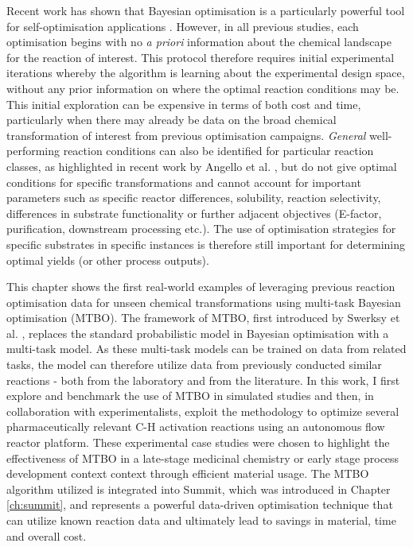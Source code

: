 Recent work has shown that Bayesian optimisation is a particularly powerful tool for self-optimisation applications \cite{Amar2019, Schweidtmann2018, Shields2021}. However, in all previous studies, each optimisation begins with no \textit{a priori} information about the chemical landscape for the reaction of interest. This protocol therefore requires initial experimental iterations whereby the algorithm is learning about the experimental design space, without any prior information on where the optimal reaction conditions may be. This initial exploration can be expensive in terms of both cost and time, particularly when there may already be data on the broad chemical transformation of interest from previous optimisation campaigns. \textit{General} well-performing reaction conditions can also be identified for particular reaction classes, as highlighted in recent work by Angello et al. \cite{Angello2022}, but do not give optimal conditions for specific transformations and cannot account for important parameters such as specific reactor differences, solubility, reaction selectivity, differences in substrate functionality or further adjacent objectives (E-factor, purification, downstream processing etc.). The use of optimisation strategies for specific substrates in specific instances is therefore still important for determining optimal yields (or other process outputs).

This chapter shows the first real-world examples of leveraging previous reaction optimisation data for unseen chemical transformations using multi-task Bayesian optimisation (MTBO). The framework of MTBO, first introduced by Swerksy et al. \cite{Swersky2013}, replaces the standard probabilistic model in Bayesian optimisation with a multi-task model. As these multi-task models can be trained on data from related tasks,  the model can therefore utilize data from previously conducted similar reactions - both from the laboratory and from the literature. In this work, I first explore and benchmark the use of MTBO in simulated studies and then, in collaboration with experimentalists, exploit the methodology to optimize several pharmaceutically relevant C-H activation reactions using an autonomous flow reactor platform. These experimental case studies were chosen to highlight the effectiveness of MTBO in a late-stage medicinal chemistry or early stage process development context context through efficient material usage. The MTBO algorithm utilized is integrated into Summit, which was introduced in Chapter \ref{ch:summit}, and represents a powerful data-driven optimisation technique that can utilize known reaction data and ultimately lead to savings in material, time and overall cost.

